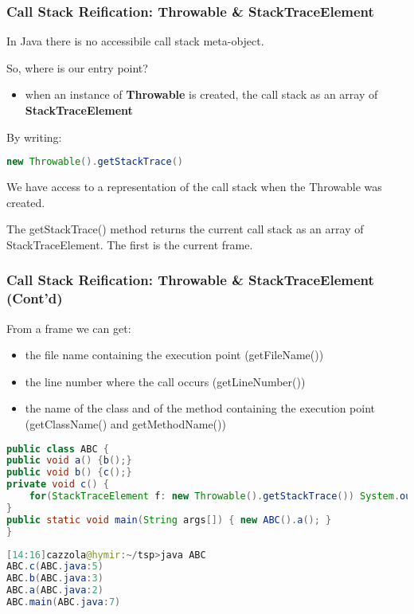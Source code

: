 \subsubsection{Call Stack Reification: Throwable & StackTraceElement}

In Java there is no accessibile call stack meta-object.

So, where is our entry point?
\begin{itemize}
	\item when an instance of \textbf{Throwable} is created, the call stack as an array of \textbf{StackTraceElement}
\end{itemize}

By writing:
\begin{lstlisting}[language=Java]
new Throwable().getStackTrace()
\end{lstlisting}

We have access to a representation of the call stack when the Throwable was created.

The getStackTrace() method returns the current call stack as an array of StackTraceElement. The first is the current frame.

\subsubsection{Call Stack Reification: Throwable & StackTraceElement (Cont'd)}
From a frame we can get:
\begin{itemize}
	\item the file name containing the execution point (getFileName())
	\item the line number where the call occurs (getLineNumber())
	\item the name of the class and of the method containing the execution point (getClassName() and getMethodName())
\end{itemize}

\begin{lstlisting}[language=Java]
public class ABC {
public void a() {b();}
public void b() {c();}
private void c() {
	for(StackTraceElement f: new Throwable().getStackTrace()) System.out.println(f);
}
public static void main(String args[]) { new ABC().a(); }
}
\end{lstlisting}

\begin{lstlisting}[language=Java]
[14:16]cazzola@hymir:~/tsp>java ABC
ABC.c(ABC.java:5)
ABC.b(ABC.java:3)
ABC.a(ABC.java:2)
ABC.main(ABC.java:7)
\end{lstlisting}

